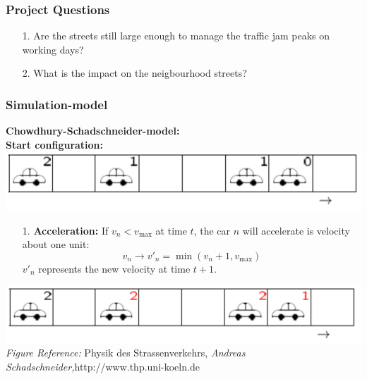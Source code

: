 \documentclass[9pt]{beamer}
\begin{document}
\begin{frame}

\frametitle{Project Questions}

\begin{itemize}
\item[1.] Are the streets still large enough to manage the traffic jam peaks on working days?
\item[2.] What is the impact on the neigbourhood streets?
\end{itemize}
\end{frame}


\begin{frame}
\frametitle{Simulation-model}

\textbf{Chowdhury-Schadschneider-model:}\\
\textbf{Start configuration:}\\
\includegraphics[width=0.7\columnwidth]{config_1.png}
\begin{itemize}
\item[1.] \textbf{Acceleration:}
If $v_n<v_{\mathrm{max}}$ at time $t$, the car $n$ will accelerate is velocity about one unit:
\begin{equation}
v_n \rightarrow v'_n = \min(v_n+1,v_\mathrm{max})
\label{accel_t}
\end{equation}
$v'_n$ represents the new velocity at time $t+1$.
\\
\end{itemize}
\includegraphics[width=0.7\columnwidth]{config_2.png}\\
\textit{Figure Reference:} Physik des Strassenverkehrs, \emph{Andreas Schadschneider,}http://www.thp.uni-koeln.de
\end{frame}
\end{document}
